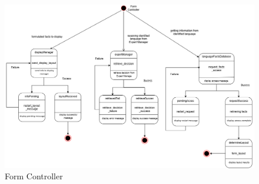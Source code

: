 \begin{figure}[H]
	\centering
	\includegraphics[width=\linewidth]{Section2/FormController.png}
	\caption{Form Controller}
	\label{FormController}
\end{figure}